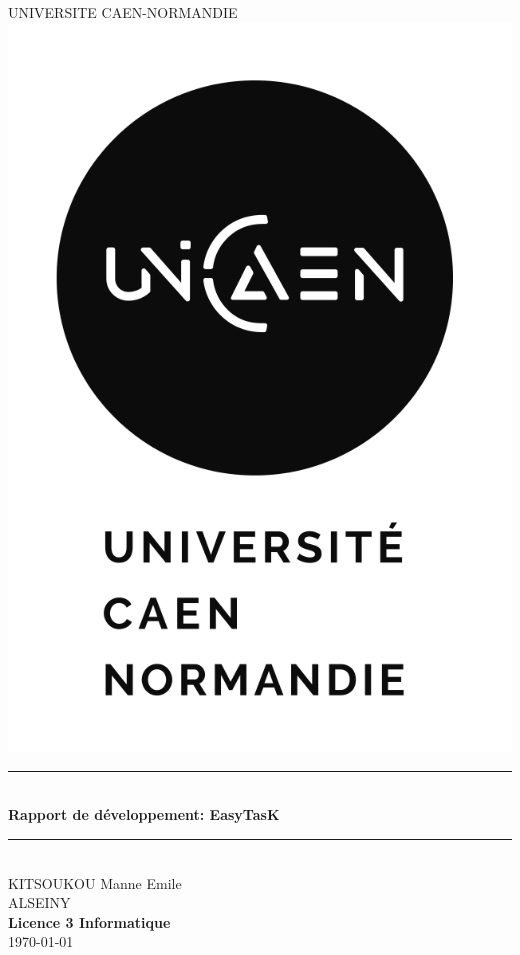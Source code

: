 \documentclass[12pt]{article}
\begin{document}
    \begin{titlepage}
        \newcommand{\HRule}{\rule{\linewidth}{0.5mm}}
        \center
        \textsc{\LARGE
        UNIVERSITE CAEN-NORMANDIE
        } \\[1cm]
        \includegraphics[scale=1]{images/LOGO-UNICAEN_V-2.2-N} \\[1cm]
        \HRule \\[0.4cm]
        { \huge \bfseries Rapport de développement: EasyTasK\\[0.15cm] }
        \HRule \\[1.5cm]
        KITSOUKOU Manne Emile\\[1cm]
        ALSEINY
        \\[1cm]
        \textbf{Licence 3 Informatique}\\
        \today \\ [1cm]
    \end{titlepage}
    \newpage
    \tableofcontents
    \newpage
\end{document}
